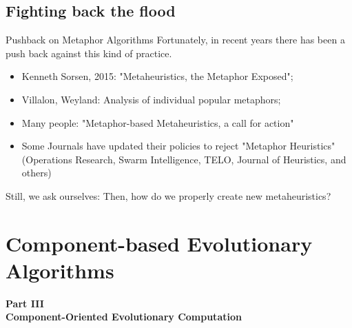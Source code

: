 \documentclass[aspectratio=169]{beamer}
\begin{document}
\subsection{Fighting back the flood}
\begin{frame}{Pushback on Metaphor Algorithms}
  Fortunately, in recent years there has been a push back against this kind of practice.\bigskip

  \begin{itemize}
    \item Kenneth Sorsen, 2015: "Metaheuristics, the Metaphor Exposed";
    \item Villalon, Weyland: Analysis of individual popular metaphors;
    \item Many people: "Metaphor-based Metaheuristics, a call for action"\bigskip

    \item Some Journals have updated their policies to reject "Metaphor Heuristics" (Operations Research, Swarm Intelligence, TELO, Journal of Heuristics, and others)
  \end{itemize}\bigskip

  \begin{block}{}
    Still, we ask ourselves: Then, how do we properly create new metaheuristics?
  \end{block}
\end{frame}

\section{Component-based Evolutionary Algorithms}

\begin{frame}
  \begin{center}
  {\large{\bf
  Part III\\
  Component-Oriented Evolutionary Computation
  }}
  \end{center}
\end{frame}
\end{document}
